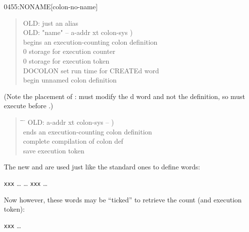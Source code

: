 \begin{newword}{0455}{:NONAME}[colon-no-name]
\begin{rationale}
\begin{quote}
\begin{tabbing}
			\word{:} OLD: \word{:} \word{;}								\>\>\>  just an alias \\[1.5\parskip]

			OLD: \word{:}  "name" -- a-addr xt colon-sys ) \\
			\+  begins an execution-counting colon definition \\
				  0 \word{,}					\>\>  storage for execution counter \\
				0 \word{,}												\>\>  storage for execution token \\
				DOCOLON													\>\>  set run time for CREATEd word \\
			\-												\>\>  begin unnamed colon definition \\
			\word{;}
		  \end{tabbing}
		\end{quote}

		(Note the placement of :  must modify
		the d word and not the  definition,
		so  must execute before .)

		\begin{quote}\ttfamily
		  \begin{tabbing}
			\tab \= \tab \= \hspace*{12em} \= \kill
			OLD: \word{;}  a-addr xt colon-sys -- ) \\
			\+  ends an execution-counting colon definition \\
				 \word{;}										\>\>  complete compilation of colon def \\
			\-	  \word{!}								\>\>  save execution token \\
			\word{;} 
		  \end{tabbing}
		\end{quote}

		The new \word{:} and \word{;} are used just like the standard
		ones to define words:

		\tab {\ldots} \word{:} \texttt{xxx} {\ldots} \word{;}
			{\ldots} \texttt{xxx} {\ldots}

		Now however, these words may be ``ticked'' to retrieve the
		count (and execution token):

		\tab {\ldots}  \texttt{xxx}   {\ldots}
	\end{rationale}
\end{newword}


